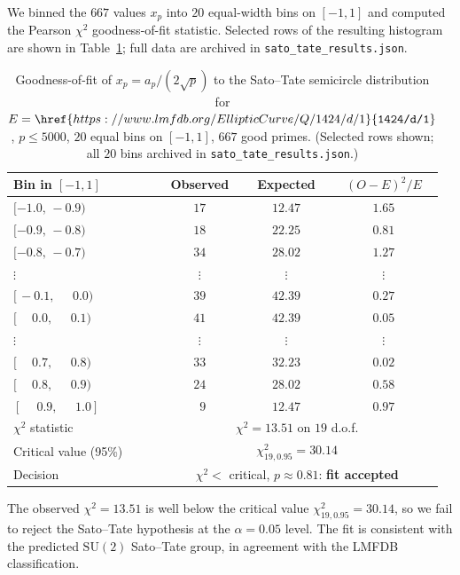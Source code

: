 \documentclass[11pt,a4paper]{article}
\theoremstyle{plain}
\theoremstyle{definition}
\newcommand{\LMFDB}[1]{\href{https://www.lmfdb.org/EllipticCurve/Q/#1}{\texttt{#1}}}
\begin{document}
We binned the $667$ values $x_p$ into $20$ equal-width bins on
$[-1, 1]$ and computed the Pearson $\chi^2$ goodness-of-fit
statistic. Selected rows of the resulting histogram are shown in
Table~\ref{tab:satotate}; full data are archived in
\texttt{sato\_tate\_results.json}.

\begin{table}[h]
\centering
\begin{tabular}{lccc}
\toprule
Bin in $[-1, 1]$ & Observed & Expected & $(O-E)^2/E$\\
\midrule
$[-1.0,\,-0.9)$ & $17$ & $12.47$ & $1.65$\\
$[-0.9,\,-0.8)$ & $18$ & $22.25$ & $0.81$\\
$[-0.8,\,-0.7)$ & $34$ & $28.02$ & $1.27$\\
$\vdots$ & $\vdots$ & $\vdots$ & $\vdots$\\
$[\,-0.1,\,\phantom{-}0.0)$ & $39$ & $42.39$ & $0.27$\\
$[\phantom{-}0.0,\,\phantom{-}0.1)$ & $41$ & $42.39$ & $0.05$\\
$\vdots$ & $\vdots$ & $\vdots$ & $\vdots$\\
$[\phantom{-}0.7,\,\phantom{-}0.8)$ & $33$ & $32.23$ & $0.02$\\
$[\phantom{-}0.8,\,\phantom{-}0.9)$ & $24$ & $28.02$ & $0.58$\\
$[\phantom{-}0.9,\,\phantom{-}1.0]$ & $\phantom{0}9$ & $12.47$ & $0.97$\\
\midrule
$\chi^2$ statistic    & \multicolumn{3}{c}{$\chi^2 = 13.51$ on $19$ d.o.f.}\\
Critical value (95\%) & \multicolumn{3}{c}{$\chi^2_{19, 0.95} = 30.14$}\\
Decision              & \multicolumn{3}{c}{$\chi^2 < $ critical, $p \approx 0.81$: \textbf{fit accepted}}\\
\bottomrule
\end{tabular}
\caption{Goodness-of-fit of $x_p = a_p/(2\sqrt p)$ to the
Sato--Tate semicircle distribution for $E = \LMFDB{1424/d/1}$,
$p \le 5000$, $20$ equal bins on $[-1, 1]$, $667$ good primes.
(Selected rows shown; all $20$ bins archived in
\texttt{sato\_tate\_results.json}.)}
\label{tab:satotate}
\end{table}

The observed $\chi^2 = 13.51$ is well below the critical value
$\chi^2_{19, 0.95} = 30.14$, so we fail to reject the Sato--Tate
hypothesis at the $\alpha = 0.05$ level. The fit is consistent with
the predicted $\mathrm{SU}(2)$ Sato--Tate group, in agreement with
the LMFDB classification.
\end{document}
